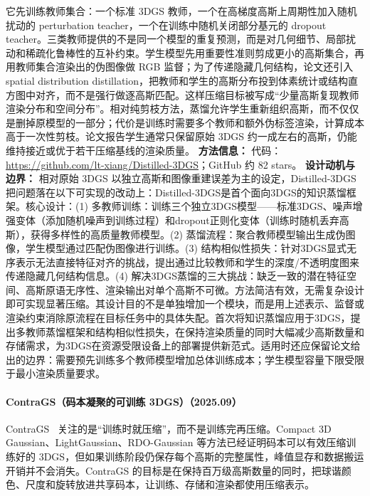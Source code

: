 它先训练教师集合：一个标准 3DGS 教师，一个在高梯度高斯上周期性加入随机扰动的 perturbation teacher，一个在训练中随机关闭部分基元的 dropout teacher。三类教师提供的不是同一个模型的重复预测，而是对几何细节、局部扰动和稀疏化鲁棒性的互补约束。学生模型先用重要性准则剪成更小的高斯集合，再用教师集合渲染出的伪图像做 RGB 监督；为了传递隐藏几何结构，论文还引入 spatial distribution distillation，把教师和学生的高斯分布投到体素统计或结构直方图中对齐，而不是强行做逐高斯匹配。这样压缩目标被写成“少量高斯复现教师渲染分布和空间分布”。相对纯剪枝方法，蒸馏允许学生重新组织高斯，而不仅仅是删掉原模型的一部分；代价是训练时需要多个教师和额外伪标签渲染，计算成本高于一次性剪枝。论文报告学生通常只保留原始 3DGS 约一成左右的高斯，仍能维持接近或优于若干压缩基线的渲染质量。
\textbf{方法信息：} 代码：\url{https://github.com/lt-xiang/Distilled-3DGS}；GitHub 约 82 stars。
\textbf{设计动机与边界：} 相对原始 3DGS 以独立高斯和图像重建误差为主的设定，Distilled-3DGS 把问题落在以下可实现的改动上：Distilled-3DGS是首个面向3DGS的知识蒸馏框架。核心设计：(1) 多教师训练：训练三个独立3DGS模型——标准3DGS、噪声增强变体（添加随机噪声到训练过程）和dropout正则化变体（训练时随机丢弃高斯），获得多样性的高质量教师模型。(2) 蒸馏流程：聚合教师模型输出生成伪图像，学生模型通过匹配伪图像进行训练。(3) 结构相似性损失：针对3DGS显式无序表示无法直接特征对齐的挑战，提出通过比较教师和学生的深度/不透明度图来传递隐藏几何结构信息。(4) 解决3DGS蒸馏的三大挑战：缺乏一致的潜在特征空间、高斯原语无序性、渲染输出对单个高斯不可微。方法简洁有效，无需复杂设计即可实现显著压缩。其设计目的不是单独增加一个模块，而是用上述表示、监督或渲染约束消除原流程在目标任务中的具体失配。首次将知识蒸馏应用于3DGS，提出多教师蒸馏框架和结构相似性损失，在保持渲染质量的同时大幅减少高斯数量和存储需求，为3DGS在资源受限设备上的部署提供新范式。适用时还应保留论文给出的边界：需要预先训练多个教师模型增加总体训练成本；学生模型容量下限受限于最小渲染质量要求。
\paragraph{ContraGS（码本凝聚的可训练 3DGS）（2025.09）}
ContraGS~\cite{2509_03775} 关注的是“训练时就压缩”，而不是训练完再压缩。Compact 3D Gaussian、LightGaussian、RDO-Gaussian 等方法已经证明码本可以有效压缩训练好的 3DGS，但如果训练阶段仍保存每个高斯的完整属性，峰值显存和数据搬运开销并不会消失。ContraGS 的目标是在保持百万级高斯数量的同时，把球谐颜色、尺度和旋转放进共享码本，让训练、存储和渲染都使用压缩表示。

